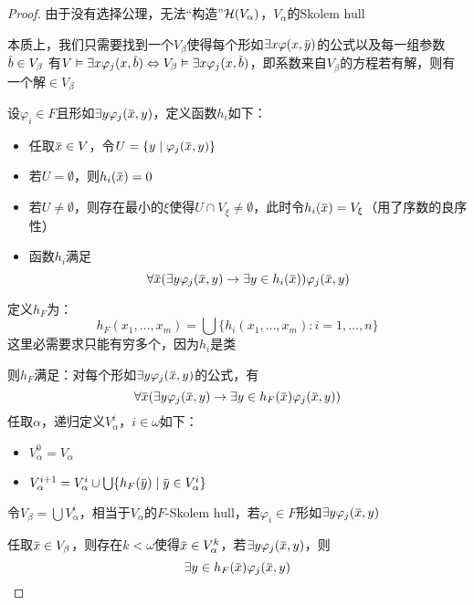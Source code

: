\documentclass[11pt]{article}
\begin{document}
\begin{proof}
由于没有选择公理，无法“构造”\(\mathcal{H}(V_\alpha)\)，\(V_\alpha\)的Skolem hull

本质上，我们只需要找到一个\(V_\beta\)使得每个形如\(\exists x\varphi(x,\bary)\)的公式以及每一组参数\(\barb\in V_\beta\)
有\(V\vDash\exists x\varphi_j(x,\barb)\Leftrightarrow V_\beta\vDash\exists x\varphi_j(x,\barb)\)，即系数来自\(V_\beta\)的方程若有解，则有一个解\(\in V_\beta\)

设\(\varphi_i\in F\)且形如\(\exists y\varphi_j(\barx,y)\)，定义函数\(h_i\)如下：
\begin{itemize}
\item 任取\(\barx\in V\)，令\(U=\{y\mid\varphi_j(\barx,y)\}\)
\item 若\(U=\emptyset\)，则\(h_i(\barx)=0\)
\item 若\(U\neq\emptyset\)，则存在最小的\(\xi\)使得\(U\cap V_\xi\neq\emptyset\)，此时令\(h_i(\barx)=V_\xi\)（用了序数的良序性）
\item 函数\(h_i\)满足
\begin{equation*}
\forall\barx(\exists y\varphi_j(\barx,y)\to\exists y\in h_i(\barx))\varphi_j(\barx,y)
\end{equation*}
\end{itemize}

定义\(h_F\)为：
\begin{equation*}
h_F(x_1,\dots,x_m)=\bigcup\{h_i(x_1,\dots,x_m):i=1,\dots,n\}
\end{equation*}
这里必需要求只能有穷多个，因为\(h_i\)是类

则\(h_F\)满足：对每个形如\(\exists y\varphi_j(\barx,y)\)的公式，有
\begin{equation*}
\forall\barx(\exists y\varphi_j(\barx,y)\to\exists y\in h_F(\barx)\varphi_j(\barx,y))
\end{equation*}
任取\(\alpha\)，递归定义\(V_\alpha^i\)，\(i\in\omega\)如下：
\begin{itemize}
\item \(V_\alpha^0=V_\alpha\)
\item \(V_\alpha^{i+1}=V_\alpha^i\cup\bigcup\{h_F(\bary)\mid\bary\in V_\alpha^i\}\)
\end{itemize}


令\(V_\beta=\bigcup V_\alpha^i\)，相当于\(V_\alpha\)的\(F\)-Skolem hull，若\(\varphi_i\in F\)形如\(\exists y\varphi_j(\barx,y)\)

任取\(\barx\in V_\beta\)，则存在\(k<\omega\)使得\(\barx\in V_\alpha^k\)，若\(\exists y\varphi_j(\barx,y)\)，则
\begin{equation*}
\exists y\in h_F(\barx)\varphi_j(\barx,y)
\end{equation*}
\end{proof}
\end{document}
